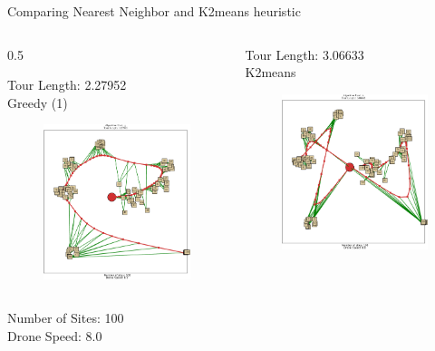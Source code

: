 \documentclass{beamer}
\begin{document}
\begin{frame}{Comparing Nearest Neighbor and K2means heuristic}
 \begin{columns}
   \begin{column} {0.5\textwidth}
      \begin{center}
        Tour Length: 2.27952 \\
            Greedy (1)
      \end{center}
      \vspace{-20pt}

      \begin{figure}
        \includegraphics[width=5.2cm]{../img/greedy_example.pdf}
      \end{figure}
    \end{column}

    \begin{column}{0.5\textwidth}
            \begin{center}
              Tour Length: 3.06633 \\
                  K2means
      \end{center}

      \vspace{-20pt}
       \begin{figure}
        \includegraphics[width=5.2cm]{../img/k2means_example.pdf}
      \end{figure}
     \end{column}
   \end{columns}

   \begin{center}
     Number of Sites: 100 \\
     Drone Speed: 8.0
   \end{center}

\end{frame}
\end{document}
